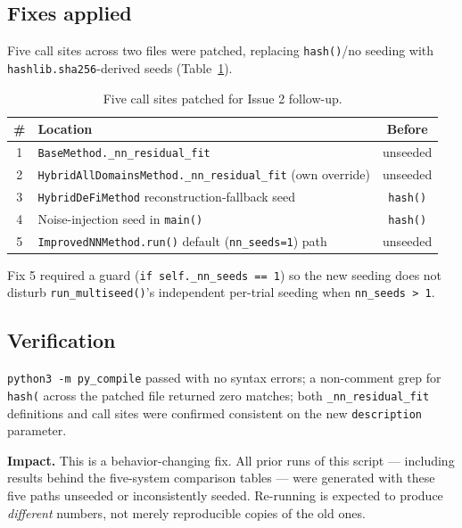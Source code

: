 \documentclass[11pt]{article}
\begin{document}
\subsection{Fixes applied}

Five call sites across two files were patched, replacing
\texttt{hash()}/no seeding with \texttt{hashlib.sha256}-derived seeds
(Table~\ref{tab:patchsites}).

\begin{table}[h]
\centering
\caption{Five call sites patched for Issue 2 follow-up.}
\label{tab:patchsites}
\small
\begin{tabular}{@{}clc@{}}
\toprule
\textbf{\#} & \textbf{Location} & \textbf{Before} \\
\midrule
1 & \texttt{BaseMethod.\_nn\_residual\_fit} & unseeded \\
2 & \texttt{HybridAllDomainsMethod.\_nn\_residual\_fit} (own override) & unseeded \\
3 & \texttt{HybridDeFiMethod} reconstruction-fallback seed & \texttt{hash()} \\
4 & Noise-injection seed in \texttt{main()} & \texttt{hash()} \\
5 & \texttt{ImprovedNNMethod.run()} default (\texttt{nn\_seeds=1}) path & unseeded \\
\bottomrule
\end{tabular}
\end{table}

Fix 5 required a guard (\texttt{if self.\_nn\_seeds == 1}) so the new
seeding does not disturb \texttt{run\_multiseed()}'s independent
per-trial seeding when \texttt{nn\_seeds > 1}.

\subsection{Verification}

\texttt{python3 -m py\_compile} passed with no syntax errors; a
non-comment grep for \texttt{hash(} across the patched file returned zero
matches; both \texttt{\_nn\_residual\_fit} definitions and call sites were
confirmed consistent on the new \texttt{description} parameter.

\textbf{Impact.} This is a behavior-changing fix. All prior runs of this
script — including results behind the five-system comparison tables —
were generated with these five paths unseeded or inconsistently seeded.
Re-running is expected to produce \emph{different} numbers, not merely
reproducible copies of the old ones.
\end{document}
